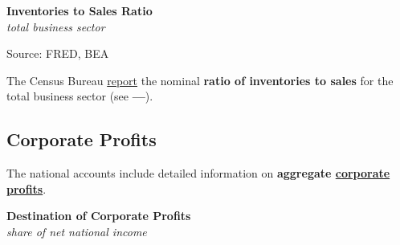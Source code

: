 \documentclass{report}
\makeatletter
\newcommand{\tbllink}[1]{\href{https://raw.githubusercontent.com/bdecon/US-chartbook/master/chartbook/data/#1}{\faTable}}
\newcommand*\short[1]{\expandafter\@gobbletwo\number\numexpr#1\relax}
\newcommand{\shdateaxisticks}{
		date coordinates in=x, axis line style={draw=none},
		xmax={2023-11-30},
		max space between ticks=40,	    
		xtick={{1990-01-01}, {1995-01-01}, {2000-01-01}, 
			{2005-01-01}, {2010-01-01}, {2015-01-01}, {2020-01-01}},
		minor xtick={},
		enlarge y limits={0.06}, enlarge x limits={0.01},
		xticklabel style={align=center, yshift=-2pt}, tick label style={inner sep=0pt},
		}
\newcommand{\stdline}[4]{\addplot[very thick, no markers, color=#1] 
		table [x=#2, y=#3, col sep=comma] {#4};	}
\newcommand{\thinline}[4]{\addplot[no markers, color=#1] 
		table [x=#2, y=#3, col sep=comma] {#4};	}
\newcommand{\rbars}{
		\fill[color=black!10] (axis cs:{1990-07-01},\pgfkeysvalueof{/pgfplots/ymin}) rectangle 
			(axis cs:{1991-03-01}, \pgfkeysvalueof{/pgfplots/ymax});
		\fill[color=black!10] (axis cs:{2007-12-01},\pgfkeysvalueof{/pgfplots/ymin}) rectangle 
			(axis cs:{2009-07-01}, \pgfkeysvalueof{/pgfplots/ymax});
		\fill[color=black!10] (axis cs:{2001-03-01},\pgfkeysvalueof{/pgfplots/ymin}) rectangle 
			(axis cs:{2001-11-01}, \pgfkeysvalueof{/pgfplots/ymax});
		\fill[color=black!10] (axis cs:{2020-02-01},\pgfkeysvalueof{/pgfplots/ymin}) rectangle 
			(axis cs:{2020-05-01}, \pgfkeysvalueof{/pgfplots/ymax});}
\makeatother
\begin{document}
{\begin{minipage}{0.39\textwidth}
\normalsize \textbf{Inventories to Sales Ratio}\\
\footnotesize{\textit{total business sector}}
\vspace{4.1cm}

\hspace*{3mm} 

\footnotesize{Source: FRED, BEA} \hfill \tbllink{isratio.csv}
\end{minipage} \hspace{6mm}
\begin{minipage}{0.32\textwidth}
\small The Census Bureau \href{https://www.census.gov/mtis/www/data/pdf/mtis_current.pdf}{report} the nominal \textbf{ratio of inventories to sales} for the total business sector (see {\color{blue!40!cyan!80!white}\textbf{---}}). 
\end{minipage}
\newpage 
\hypertarget{buspr}{\label{buspr}}
\begin{minipage}{0.76\textwidth}   
\subsection*{Corporate Profits}
\small The national accounts include detailed information on \textbf{aggregate \href{https://www.bea.gov/data/income-saving/corporate-profits}{corporate profits}}.  
\vspace{1mm}

\normalsize \textbf{Destination of Corporate Profits}\\
\footnotesize{\textit{share of net national income}}
\vspace{3.5cm}


\end{minipage}}
\end{document}
